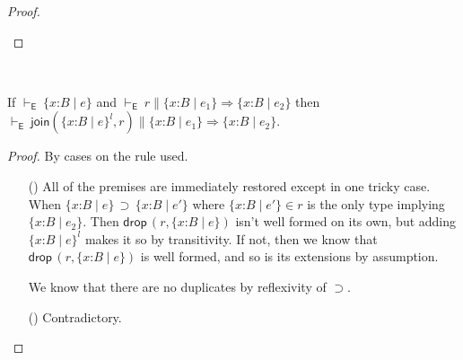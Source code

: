 \documentclass[9pt]{extarticle}
\newcommand{\ottnt}[1]{\mathit{#1}}
\newcommand{\ottsym}[1]{#1}
\begin{document}
\begin{lemma}
\begin{proof}
{\begin{itemize}
    \end{itemize}
    \fi}
  \end{proof}
\end{lemma}

\begin{lemma}
  \label{lem:eideticextendrefinements}
  ~

  \noindent
  If $ \mathord{  \vdash _{  \mathsf{E}  } }~  \{ \mathit{x} \mathord{:} \ottnt{B} \mathrel{\mid} \ottnt{e} \}  $ and $ \mathord{  \vdash _{  \mathsf{E}  } }~ \ottnt{r}   \mathrel{\parallel}    \{ \mathit{x} \mathord{:} \ottnt{B} \mathrel{\mid} \ottnt{e_{{\mathrm{1}}}} \}   \Rightarrow   \{ \mathit{x} \mathord{:} \ottnt{B} \mathrel{\mid} \ottnt{e_{{\mathrm{2}}}} \}  $ then $ \mathord{  \vdash _{  \mathsf{E}  } }~  \mathsf{join} (  \{ \mathit{x} \mathord{:} \ottnt{B} \mathrel{\mid} \ottnt{e} \}^{ \ottnt{l} }  , \ottnt{r} )    \mathrel{\parallel}    \{ \mathit{x} \mathord{:} \ottnt{B} \mathrel{\mid} \ottnt{e_{{\mathrm{1}}}} \}   \Rightarrow   \{ \mathit{x} \mathord{:} \ottnt{B} \mathrel{\mid} \ottnt{e_{{\mathrm{2}}}} \}  $.
\begin{proof}
    By cases on the rule used.
\begin{itemize}
    \item[(\A{Refine})] All of the premises are immediately restored
      except in one tricky case. When $ \{ \mathit{x} \mathord{:} \ottnt{B} \mathrel{\mid} \ottnt{e} \}  \, \supset \,  \{ \mathit{x} \mathord{:} \ottnt{B} \mathrel{\mid} \ottnt{e'} \} $
      where $ \{ \mathit{x} \mathord{:} \ottnt{B} \mathrel{\mid} \ottnt{e'} \} \in  \ottnt{r} $ is the only type implying
      $ \{ \mathit{x} \mathord{:} \ottnt{B} \mathrel{\mid} \ottnt{e_{{\mathrm{2}}}} \} $. Then $\mathsf{drop} \, \ottsym{(}  \ottnt{r}  \ottsym{,}   \{ \mathit{x} \mathord{:} \ottnt{B} \mathrel{\mid} \ottnt{e} \}   \ottsym{)}$ isn't well formed on its
      own, but adding $ \{ \mathit{x} \mathord{:} \ottnt{B} \mathrel{\mid} \ottnt{e} \}^{ \ottnt{l} } $ makes it so by
      transitivity. If not, then we know that $\mathsf{drop} \, \ottsym{(}  \ottnt{r}  \ottsym{,}   \{ \mathit{x} \mathord{:} \ottnt{B} \mathrel{\mid} \ottnt{e} \}   \ottsym{)}$ is well formed, and so is its extensions by
      assumption.

      We know that there are no duplicates by reflexivity of
      $ \supset $.
    \item[(\A{Fun})] Contradictory.
    \end{itemize}
  \end{proof}
\end{lemma}
\end{document}

